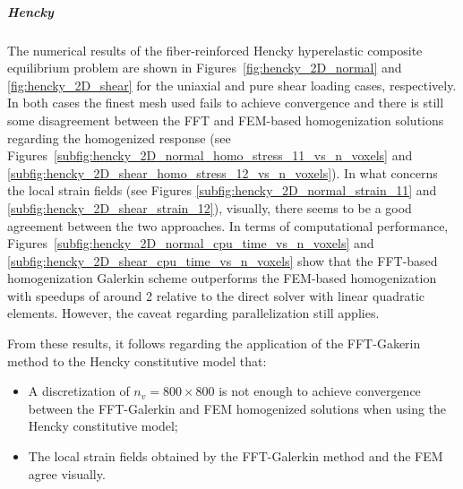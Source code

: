 \subparagraph{Hencky}

The numerical results of the fiber-reinforced Hencky hyperelastic composite equilibrium problem are shown in Figures~\ref{fig:hencky_2D_normal} and \ref{fig:hencky_2D_shear} for the uniaxial and pure shear loading cases, respectively.
In both cases the finest mesh used fails to achieve convergence and there is still some disagreement between the FFT and FEM-based homogenization solutions regarding the homogenized response (see Figures~\ref{subfig:hencky_2D_normal_homo_stress_11_vs_n_voxels} and \ref{subfig:hencky_2D_shear_homo_stress_12_vs_n_voxels}).
In what concerns the local strain fields (see Figures \ref{subfig:hencky_2D_normal_strain_11} and \ref{subfig:hencky_2D_shear_strain_12}), visually, there seems to be a good agreement between the two approaches.
In terms of computational performance, Figures~\ref{subfig:hencky_2D_normal_cpu_time_vs_n_voxels} and \ref{subfig:hencky_2D_shear_cpu_time_vs_n_voxels} show that the FFT-based homogenization Galerkin scheme outperforms the FEM-based homogenization with speedups of around 2 relative to the direct solver with linear quadratic elements.
However, the caveat regarding parallelization still applies.

From these results, it follows regarding the application of the FFT-Gakerin method to the Hencky constitutive model that:
\begin{itemize}
  \item A discretization of \(n_v=800\times 800\) is not enough to achieve convergence between the FFT-Galerkin and FEM homogenized solutions when using the Hencky constitutive model;
  \item The local strain fields obtained by the FFT-Galerkin method and the FEM agree visually.
\end{itemize}

